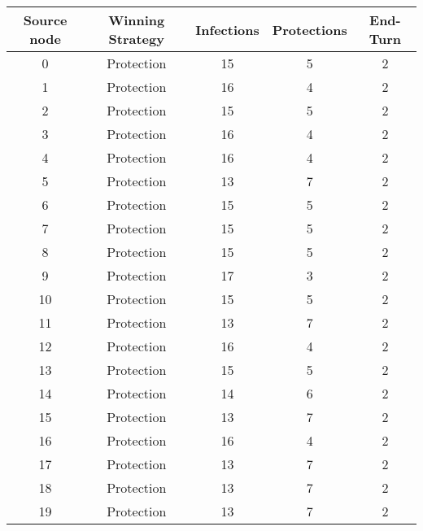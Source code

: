 \documentclass[results.tex]{subfiles}
\begin{document}
\begin{center}
  \begin{tabular}{| c || c | c | c | c |}
    \hline
    {\bfseries Source node} & {\bfseries Winning Strategy} & {\bfseries Infections} & {\bfseries Protections} & {\bfseries End-Turn} \\  %
    \hline\hline
    0 & Protection & 15 & 5 & 2 \\
    \hline
    1 & Protection & 16 & 4 & 2 \\
    \hline
    2 & Protection & 15 & 5 & 2 \\
    \hline
    3 & Protection & 16 & 4 & 2 \\
    \hline
    4 & Protection & 16 & 4 & 2 \\
    \hline 
    5 & Protection & 13 & 7 & 2 \\
    \hline
    6 & Protection & 15 & 5 & 2 \\
    \hline
    7 & Protection & 15 & 5 & 2 \\
    \hline
    8 & Protection & 15 & 5 & 2 \\
    \hline
    9 & Protection & 17 & 3 & 2 \\
    \hline
    10 & Protection & 15 & 5 & 2 \\
    \hline
    11 & Protection & 13 & 7 & 2 \\
    \hline
    12 & Protection & 16 & 4 & 2 \\
    \hline
    13 & Protection & 15 & 5 & 2 \\
    \hline
    14 & Protection & 14 & 6 & 2 \\
    \hline
    15 & Protection & 13 & 7 & 2 \\
    \hline
    16 & Protection & 16 & 4 & 2 \\
    \hline
    17 & Protection & 13 & 7 & 2 \\
    \hline
    18 & Protection & 13 & 7 & 2 \\
    \hline
    19 & Protection & 13 & 7 & 2 \\
    \hline
  \end{tabular}
\end{center}
\end{document}
